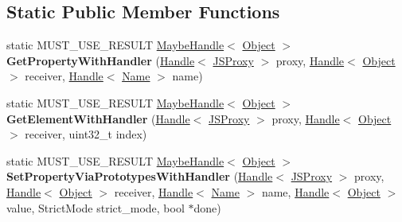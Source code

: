 \subsection*{Static Public Member Functions}
\begin{DoxyCompactItemize}
\item 
\hypertarget{classv8_1_1internal_1_1_j_s_proxy_a0ac495f6df86b5eeb9c4c831bbb45677}{}static M\+U\+S\+T\+\_\+\+U\+S\+E\+\_\+\+R\+E\+S\+U\+L\+T \hyperlink{classv8_1_1internal_1_1_maybe_handle}{Maybe\+Handle}$<$ \hyperlink{classv8_1_1internal_1_1_object}{Object} $>$ {\bfseries Get\+Property\+With\+Handler} (\hyperlink{classv8_1_1internal_1_1_handle}{Handle}$<$ \hyperlink{classv8_1_1internal_1_1_j_s_proxy}{J\+S\+Proxy} $>$ proxy, \hyperlink{classv8_1_1internal_1_1_handle}{Handle}$<$ \hyperlink{classv8_1_1internal_1_1_object}{Object} $>$ receiver, \hyperlink{classv8_1_1internal_1_1_handle}{Handle}$<$ \hyperlink{classv8_1_1internal_1_1_name}{Name} $>$ name)\label{classv8_1_1internal_1_1_j_s_proxy_a0ac495f6df86b5eeb9c4c831bbb45677}

\item 
\hypertarget{classv8_1_1internal_1_1_j_s_proxy_a236ba4d280ba95c656b2283711929537}{}static M\+U\+S\+T\+\_\+\+U\+S\+E\+\_\+\+R\+E\+S\+U\+L\+T \hyperlink{classv8_1_1internal_1_1_maybe_handle}{Maybe\+Handle}$<$ \hyperlink{classv8_1_1internal_1_1_object}{Object} $>$ {\bfseries Get\+Element\+With\+Handler} (\hyperlink{classv8_1_1internal_1_1_handle}{Handle}$<$ \hyperlink{classv8_1_1internal_1_1_j_s_proxy}{J\+S\+Proxy} $>$ proxy, \hyperlink{classv8_1_1internal_1_1_handle}{Handle}$<$ \hyperlink{classv8_1_1internal_1_1_object}{Object} $>$ receiver, uint32\+\_\+t index)\label{classv8_1_1internal_1_1_j_s_proxy_a236ba4d280ba95c656b2283711929537}

\item 
\hypertarget{classv8_1_1internal_1_1_j_s_proxy_a7542dc643c76e131be84c309f0aca74d}{}static M\+U\+S\+T\+\_\+\+U\+S\+E\+\_\+\+R\+E\+S\+U\+L\+T \hyperlink{classv8_1_1internal_1_1_maybe_handle}{Maybe\+Handle}$<$ \hyperlink{classv8_1_1internal_1_1_object}{Object} $>$ {\bfseries Set\+Property\+Via\+Prototypes\+With\+Handler} (\hyperlink{classv8_1_1internal_1_1_handle}{Handle}$<$ \hyperlink{classv8_1_1internal_1_1_j_s_proxy}{J\+S\+Proxy} $>$ proxy, \hyperlink{classv8_1_1internal_1_1_handle}{Handle}$<$ \hyperlink{classv8_1_1internal_1_1_object}{Object} $>$ receiver, \hyperlink{classv8_1_1internal_1_1_handle}{Handle}$<$ \hyperlink{classv8_1_1internal_1_1_name}{Name} $>$ name, \hyperlink{classv8_1_1internal_1_1_handle}{Handle}$<$ \hyperlink{classv8_1_1internal_1_1_object}{Object} $>$ value, Strict\+Mode strict\+\_\+mode, bool $\ast$done)\label{classv8_1_1internal_1_1_j_s_proxy_a7542dc643c76e131be84c309f0aca74d}


\end{DoxyCompactItemize}

